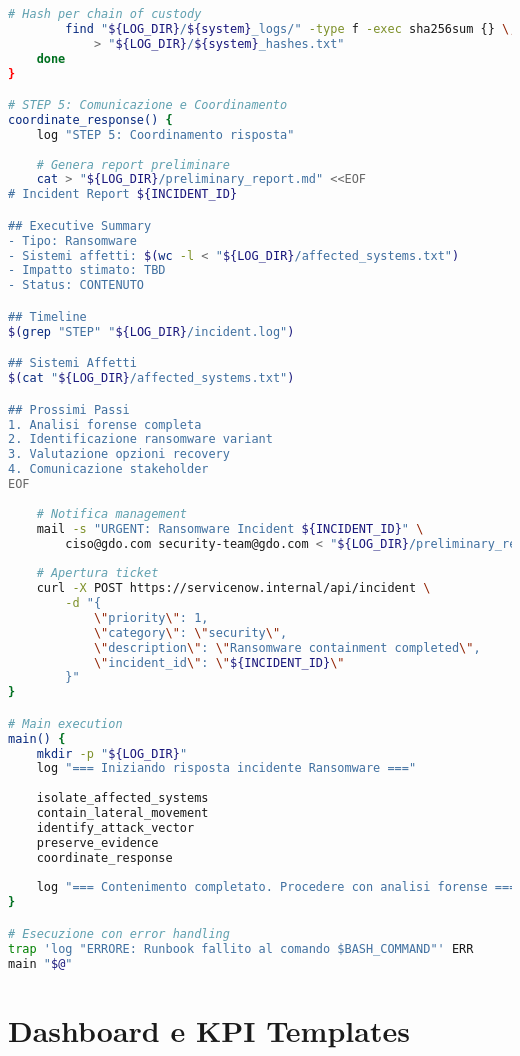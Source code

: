 \begin{lstlisting}[language=bash, caption=Runbook automatizzato per contenimento ransomware]
        # Hash per chain of custody
        find "${LOG_DIR}/${system}_logs/" -type f -exec sha256sum {} \; \
            > "${LOG_DIR}/${system}_hashes.txt"
    done
}

# STEP 5: Comunicazione e Coordinamento
coordinate_response() {
    log "STEP 5: Coordinamento risposta"
    
    # Genera report preliminare
    cat > "${LOG_DIR}/preliminary_report.md" <<EOF
# Incident Report ${INCIDENT_ID}

## Executive Summary
- Tipo: Ransomware
- Sistemi affetti: $(wc -l < "${LOG_DIR}/affected_systems.txt")
- Impatto stimato: TBD
- Status: CONTENUTO

## Timeline
$(grep "STEP" "${LOG_DIR}/incident.log")

## Sistemi Affetti
$(cat "${LOG_DIR}/affected_systems.txt")

## Prossimi Passi
1. Analisi forense completa
2. Identificazione ransomware variant
3. Valutazione opzioni recovery
4. Comunicazione stakeholder
EOF
    
    # Notifica management
    mail -s "URGENT: Ransomware Incident ${INCIDENT_ID}" \
        ciso@gdo.com security-team@gdo.com < "${LOG_DIR}/preliminary_report.md"
    
    # Apertura ticket
    curl -X POST https://servicenow.internal/api/incident \
        -d "{
            \"priority\": 1,
            \"category\": \"security\",
            \"description\": \"Ransomware containment completed\",
            \"incident_id\": \"${INCIDENT_ID}\"
        }"
}

# Main execution
main() {
    mkdir -p "${LOG_DIR}"
    log "=== Iniziando risposta incidente Ransomware ==="
    
    isolate_affected_systems
    contain_lateral_movement
    identify_attack_vector
    preserve_evidence
    coordinate_response
    
    log "=== Contenimento completato. Procedere con analisi forense ==="
}

# Esecuzione con error handling
trap 'log "ERRORE: Runbook fallito al comando $BASH_COMMAND"' ERR
main "$@"
\end{lstlisting}

\section{\texorpdfstring{Dashboard e KPI Templates}{D.4 - Dashboard e KPI Templates}}

